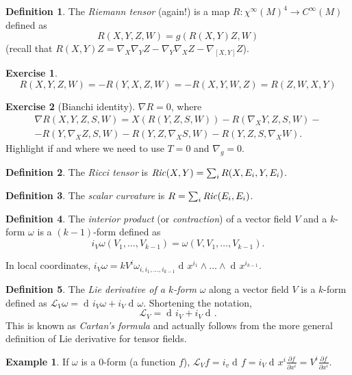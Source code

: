 \documentclass[a4paper,12pt]{book}
\newcommand{\dd}{\mathop{\mathrm{d}\!}{}}
\theoremstyle{definition}
\newtheorem{definition}{Definition}
\newtheorem{example}{Example}
\newtheorem{exercise}{Exercise}
\theoremstyle{remark}
\newcommand{\pedantic}[1]{{#1}}
\begin{document}
\begin{definition}
The \emph{Riemann tensor} (again!) is a map $R\colon\chi^\infty(M)^4\to C^\infty(M)$ defined as
\[R(X,Y,Z,W)=g(R(X,Y)Z,W)\]
(recall that $R(X,Y)Z=\nabla_X\nabla_YZ-\nabla_Y\nabla_XZ-\nabla_{[X,Y]}Z$).
\end{definition}

\begin{exercise}
\[R(X,Y,Z,W)=-R(Y,X,Z,W)=-R(X,Y,W,Z)=R(Z,W,X,Y)\]
\label{riemannsymmetries}
\end{exercise}

\begin{exercise}[Bianchi identity]
$\nabla R=0$, where
\begin{multline*}
\nabla R(X,Y,Z,S,W)=X(R(Y,Z,S,W))-R(\nabla_XY,Z,S,W)-\\
-R(Y,\nabla_XZ,S,W)-R(Y,Z,\nabla_XS,W)-R(Y,Z,S,\nabla_XW).\end{multline*}
Highlight if and where we need to use $T=0$ and $\nabla_g=0$.
\end{exercise}

\begin{definition}
The \emph{Ricci tensor} is $\text{\emph{Ric}}(X,Y)=\sum_i R(X,E_i,Y,E_i)$.
\end{definition}

\begin{definition}
The \emph{scalar curvature} is $R=\sum_i \text{\emph{Ric}}(E_i,E_i)$.
\end{definition}

\begin{definition}
The \emph{interior product} (or \emph{contraction}) of a vector field $V$ and a $k$-form $\omega$ is a $(k-1)$-form defined as
\[i_V\omega(V_1,\ldots,V_{k-1})=\omega(V,V_1,\ldots,V_{k-1}).\]
\end{definition}

In local coordinates, $i_V\omega=kV^i\omega_{i,i_1,\ldots,i_{k-1}}\dd x^{i_1}\wedge\ldots\wedge\dd x^{i_{k-1}}$.

\begin{definition}
The \emph{Lie derivative of a $k$-form} $\omega$ along a vector field $V$ is a $k$-form defined as $\mathcal L_V\omega=\dd i_V\omega+i_V\dd\omega$. Shortening the notation,
\[\mathcal L_V=\dd i_V+i_V\dd.\]
\pedantic{This is known as \emph{Cartan's formula} and actually follows from the more general definition of Lie derivative for tensor fields.}
\end{definition}

\begin{example}
If $\omega$ is a 0-form (a function $f$), $\mathcal L_Vf=i_v\dd f=i_V\dd x^i\frac{\partial f}{\partial x^i}=V^i\frac{\partial f}{\partial x^i}.$
\end{example}
\end{document}
